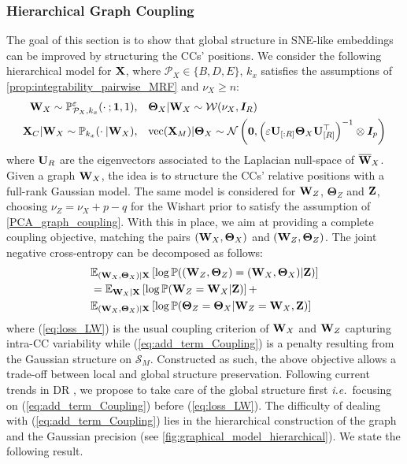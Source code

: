 \subsubsection{Hierarchical Graph Coupling}\label{sec:hierarchical_modelling}

The goal of this section is to show that global structure in SNE-like embeddings can be improved by structuring the CCs' positions. We consider the following hierarchical model for $\mathbf{X}$, where $\mathcal{P}_{X} \in \{B,D,E\}$, $k_x$ satisfies the assumptions of \cref{prop:integrability_pairwise_MRF} and $\nu_{X} \geq n$:
\begin{align*}
    \mathbf{W}_{X} \sim \mathbb{P}_{\mathcal{P}_X,k_x}^{\varepsilon}(\cdot \: ; \bm{1},1), &\quad \bm{\Theta}_{X} | \mathbf{W}_{X} \sim \mathcal{W}(\nu_{X}, \bm{I}_{R}) \\
    \mathbf{X}_{C} |\mathbf{W}_{X} \sim \mathbb{P}_{k_x}(\cdot \:| \mathbf{W}_{X}), &\quad \mathrm{vec}(\mathbf{X}_{M}) | \bm{\Theta}_{X} \sim \mathcal{N}\left(\bm{0}, \left(\varepsilon \mathbf{U}_{[:R]}  \bm{\Theta}_{X}\mathbf{U}^\top_{[R]}\right)^{-1} \otimes \bm{I}_p\right)
\end{align*}
where $\mathbf{U}_{R}$ are the eigenvectors associated to the Laplacian null-space of $\overline{\mathbf{W}}_{X}$. Given a graph $\mathbf{W}_{X}$, the idea is to structure the CCs' relative positions with a full-rank Gaussian model.
The same model is considered for $\mathbf{W}_{Z}$, $\bm{\Theta}_{Z}$ and $\mathbf{Z}$, choosing $\nu_{Z} = \nu_{X} + p - q$ for the Wishart prior to satisfy the assumption of \cref{PCA_graph_coupling}.  With this in place, we aim at providing a complete coupling objective, matching the pairs  $(\mathbf{W}_{X},\bm{\Theta}_{X})$ and  $(\mathbf{W}_{Z},\bm{\Theta}_{Z})$. The joint negative cross-entropy can be decomposed as follows:
\begin{align}
    &\mathbb{E}_{(\mathbf{W}_{X}, \bm{\Theta}_{X})|\mathbf{X}}\left[\log \mathbb{P}((\mathbf{W}_{Z},\bm{\Theta}_{Z}) = (\mathbf{W}_{X},\bm{\Theta}_{X}) | \mathbf{Z})\right] \nonumber\\
    &= \mathbb{E}_{\mathbf{W}_{X}|\mathbf{X}}\left[\log \mathbb{P}(\mathbf{W}_{Z} = \mathbf{W}_{X} | \mathbf{Z})\right] + \label{eq:loss_LW} \\
    & \mathbb{E}_{(\mathbf{W}_{X},\bm{\Theta}_{X})|\mathbf{X}}\left[ \log \mathbb{P}(\bm{\Theta}_{Z} = \bm{\Theta}_{X}| \mathbf{W}_{Z} = \mathbf{W}_{X}, \mathbf{Z}) \right] \label{eq:add_term_Coupling}
\end{align}
where (\ref{eq:loss_LW}) is the usual coupling criterion of $\mathbf{W}_X$ and $\mathbf{W}_Z$ capturing intra-CC variability while (\ref{eq:add_term_Coupling}) is a penalty resulting from the Gaussian structure on $\mathcal{S}_{M}$. Constructed as such, the above objective allows a trade-off between local and global structure preservation. Following current trends in DR \citep{kobak2021initialization}, we propose to take care of the global structure first \textit{i.e.}\ focusing on (\ref{eq:add_term_Coupling}) before (\ref{eq:loss_LW}). The difficulty of dealing with (\ref{eq:add_term_Coupling}) lies in the hierarchical construction of the graph and the Gaussian precision (see \cref{fig:graphical_model_hierarchical}). We state the following result.

